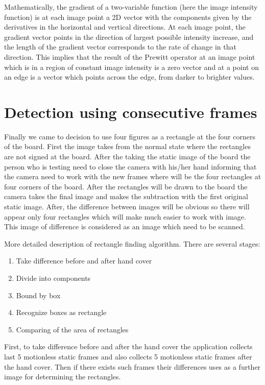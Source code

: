 Mathematically, the gradient of a two-variable function (here the image intensity function) is at each image point a 2D vector with the components given by the derivatives in the horizontal and vertical directions. At each image point, the gradient vector points in the direction of largest possible intensity increase, and the length of the gradient vector corresponds to the rate of change in that direction. This implies that the result of the Prewitt operator at an image point which is in a region of constant image intensity is a zero vector and at a point on an edge is a vector which points across the edge, from darker to brighter values. \cite{Raman}

\section{Detection using consecutive frames}

Finally we came to decision to use four figures as a rectangle at the four corners of the board. First the image takes from the normal state where the rectangles are not signed at the board. After the taking the static image of the board the person who is testing need to close the camera with his/her hand informing that the camera need to work with the new frames where will be the four rectangles at four corners of the board. After the rectangles will be drawn to the board the camera takes the final image and makes the subtraction with the first original static image. After, the difference between images will be obvious so there will appear only four rectangles which will make much easier to work with image. This image of difference is considered as an image which need to be scanned. 

More detailed description of rectangle finding algorithm. There are several stages:
\begin{enumerate}
\item Take difference before and after hand cover
\item Divide into components
\item Bound by box
\item Recognize boxes as rectangle
\item Comparing of the area of rectangles
\end{enumerate}

First, to take difference before and after the hand cover the application collects last 5 motionless static frames and also collects 5 motionless static frames after the hand cover. Then if there exists such frames their differences uses as a further image for determining the rectangles. 

